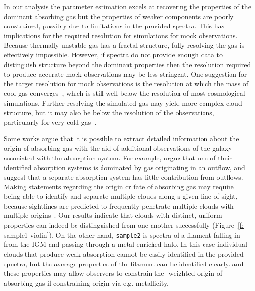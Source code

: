 \documentclass[fleqn,usenatbib]{mnras}
\begin{document}
In our analysis the parameter estimation excels at recovering the properties of the dominant absorbing gas
but the properties of weaker components are poorly constrained,
possibly due to limitations in the provided spectra.
This has implications for the required resolution for simulations for mock observations.
Because thermally unstable gas has a fractal structure, fully resolving the gas is effectively impossible.
However, if spectra do not provide enough data to distinguish structure beyond the dominant properties then the resolution required to produce accurate mock observations may be less stringent.
One suggestion for the target resolution for mock observations is the resolution at which the mass of cool gas converges~\citep[e.g.][, though such a scale may not exist]{mccourt2018Characteristic},
which is still well below the resolution of most cosmological simulations.
Further resolving the simulated gas may yield more complex cloud structure,
but it may also be below the resolution of the observations, particularly for very cold gas~\citep[e.g.][]{jones2010Bare}.

Some works argue that it is possible to extract detailed information about the origin of absorbing gas with the aid of additional observations of the galaxy associated with the absorption system.
For example, \cite{peroux2013SINFONI} argue that one of their identified absorption systems is dominated by gas originating in an outflow, and \cite{peroux2017Nature} suggest that a separate absorption system has little contribution from outflows.
Making statements regarding the origin or fate of absorbing gas may require being able to identify and separate multiple clouds along a given line of sight,
because sightlines are predicted to frequently penetrate multiple clouds with multiple origins~\citep[e.g.][]{hafen2019Origins, hafen2020Fates}.
Our results indicate that clouds with distinct, uniform properties can indeed be distinguished from one another successfully (Figure~\ref{f: sample1 violin}).
On the other hand, \texttt{sample2} is spectra of a filament falling in from the IGM and passing through a metal-enriched halo.
In this case individual clouds that produce weak absorption cannot be easily identified in the provided spectra,
but the average properties of the filament can be identified clearly.
and these properties may allow observers to constrain the -weighted origin of absorbing gas if constraining origin via e.g. metallicity.
\end{document}

